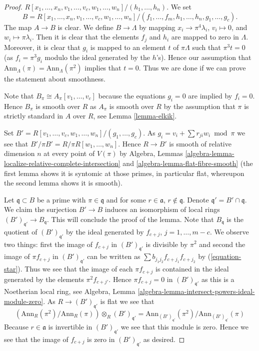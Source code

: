 \begin{proof}
$R[x_1, \ldots, x_n, v_1, \ldots, v_c, w_1, \ldots, w_n]/
(h_1, \ldots, h_n)$. We set
$$
B = R[x_1, \ldots, x_n, v_1, \ldots, v_c, w_1, \ldots, w_n]/
(f_1, \ldots, f_m, h_1, \ldots, h_n, g_1, \ldots, g_c).
$$
The map $A \to B$ is clear. We define $B \to \Lambda$ by mapping
$x_i \to \pi^4\lambda_i$, $v_i \mapsto 0$, and $w_i \mapsto \pi \lambda_i$.
Then it is clear that the elements $f_j$ and $h_i$ are mapped to zero
in $\Lambda$. Moreover, it is clear that $g_i$ is mapped to an element
$t$ of $\pi\Lambda$ such that $\pi^3t = 0$ (as $f_i = \pi^3 g_i$ modulo
the ideal generated by the $h$'s). Hence our assumption that
$\text{Ann}_\Lambda(\pi) = \text{Ann}_\Lambda(\pi^2)$ implies that $t = 0$.
Thus we are done if we can prove the statement about smoothness.

\medskip\noindent
Note that $B_\pi \cong A_\pi[v_1, \ldots, v_c]$ because the equations
$g_i = 0$ are implied by $f_i = 0$. Hence $B_\pi$ is smooth over $R$
as $A_\pi$ is smooth over $R$ by the assumption that $\pi$ is strictly
standard in $A$ over $R$, see
Lemma \ref{lemma-elkik}.

\medskip\noindent
Set $B' = R[v_1, \ldots, v_c, w_1, \ldots, w_n]/(g_1, \ldots, g_c)$.
As $g_i = v_i + \sum r_{ji}w_i \bmod \pi$ we see that
$B'/\pi B' = R/\pi R[w_1, \ldots, w_n]$. Hence
$R \to B'$ is smooth of relative dimension $n$ at every
point of $V(\pi)$ by
Algebra, Lemmas
\ref{algebra-lemma-localize-relative-complete-intersection} and
\ref{algebra-lemma-flat-fibre-smooth}
(the first lemma shows it is syntomic at those primes, in particular
flat, whereupon the second lemma shows it is smooth).

\medskip\noindent
Let $\mathfrak q \subset B$ be a prime with $\pi \in \mathfrak q$ and
for some $r \in \mathfrak a$, $r \not \in \mathfrak q$.
Denote $\mathfrak q' = B' \cap \mathfrak q$.
We claim the surjection $B' \to B$ induces an isomorphism of local
rings $(B')_{\mathfrak q'} \to B_\mathfrak q$. This will
conclude the proof of the lemma. Note that $B_\mathfrak q$ is the
quotient of $(B')_{\mathfrak q'}$ by the ideal generated by
$f_{c + j}$, $j = 1, \ldots, m - c$. We observe two things:
first the image of $f_{c + j}$ in $(B')_{\mathfrak q'}$ is
divisible by $\pi^2$ and
second the image of $\pi f_{c + j}$ in $(B')_{\mathfrak q'}$
can be written as $\sum b_{j_1 j_2} f_{c + j_1}f_{c + j_2}$ by
(\ref{equation-star}). Thus we see that the image of each $\pi f_{c + j}$
is contained in the ideal generated by the elements $\pi^2 f_{c + j'}$.
Hence $\pi f_{c + j} = 0$ in $(B')_{\mathfrak q'}$ as this is a
Noetherian local ring, see
Algebra, Lemma \ref{algebra-lemma-intersect-powers-ideal-module-zero}.
As $R \to (B')_{\mathfrak q'}$ is flat we see that
$$
\left(\text{Ann}_R(\pi^2)/\text{Ann}_R(\pi)\right)
\otimes_R (B')_{\mathfrak q'}
=
\text{Ann}_{(B')_{\mathfrak q'}}(\pi^2)/\text{Ann}_{(B')_{\mathfrak q'}}(\pi)
$$
Because $r \in \mathfrak a$ is invertible in
$(B')_{\mathfrak q'}$ we see that this module is zero.
Hence we see that the image of $f_{c + j}$ is zero in
$(B')_{\mathfrak q'}$ as desired.
\end{proof}

